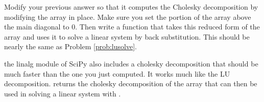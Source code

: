 \begin{problem}
Modify your previous answer so that it computes the Cholesky decomposition by modifying the array in place.
Make sure you set the portion of the array above the main diagonal to 0.
Then write a function that takes this reduced form of the array and uses it to solve a linear system by back substitution.
This should be nearly the same as Problem \ref{prob:lusolve}.
\end{problem}

the linalg module of SciPy also includes a cholesky decomposition that should be much faster than the one you just computed.
It works much like the LU decomposition.
 returns the cholesky decomposition of the array that can then be used in solving a linear system with .